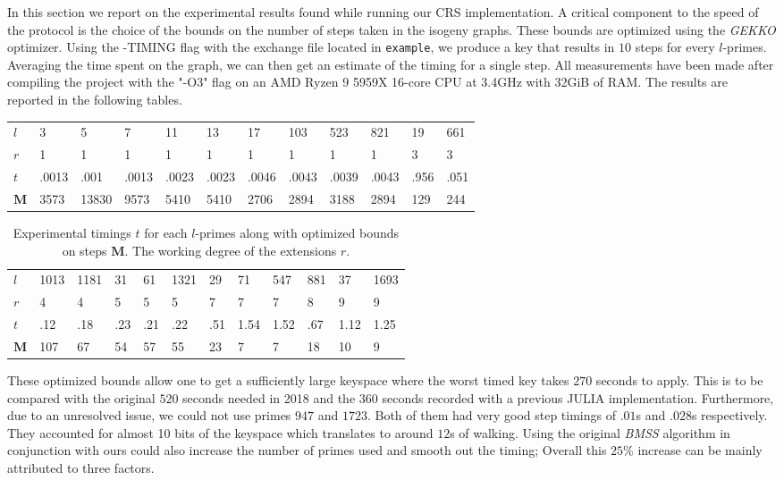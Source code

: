 \documentclass[../main.tex]{subfiles}
\begin{document}
In this section we report on the experimental results found while running our CRS implementation.
A critical component to the speed of the protocol is the choice of the bounds on the number of steps taken in the isogeny graphs.
These bounds are optimized using the \textit{GEKKO} optimizer.
Using the -TIMING flag with the exchange file located in \texttt{example}, we produce a key that results in $10$ steps for every $l$-primes.
Averaging the time spent on the graph, we can then get an estimate of the timing for a single step.
All measurements have been made after compiling the project with the "-O3" flag on an AMD Ryzen 9 5959X 16-core CPU at 3.4GHz with 32GiB of RAM.
The results are reported in the following tables.

\begin{table}[h]
\begin{tabular}{llllllllllll}
\cline{1-1}
\multicolumn{1}{|l|}{$l$} & 3     & 5     & 7     & 11    & 13    & 17    & 103   & 523   & 821   & 19   & 661  \\ \cline{1-1}
$r$                       & 1     & 1     & 1     & 1     & 1     & 1     & 1     & 1     & 1     & 3    & 3    \\
$t$                       & .0013 & .001  & .0013 & .0023 & .0023 & .0046 & .0043 & .0039 & .0043 & .956 & .051 \\
$\mathbf{M}$              & 3573  & 13830 & 9573  & 5410  & 5410  & 2706  & 2894  & 3188  & 2894  & 129  & 244
\end{tabular}
\end{table}
\begin{table}[h]
\begin{tabular}{llllllllllll}
\cline{1-1}
\multicolumn{1}{|l|}{$l$} & 1013 & 1181 & 31  & 61  & 1321 & 29  & 71   & 547  & 881 & 37   & 1693 \\ \cline{1-1}
$r$                       & 4    & 4    & 5   & 5   & 5    & 7   & 7    & 7    & 8   & 9    & 9    \\
$t$                       & .12  & .18  & .23 & .21 & .22  & .51 & 1.54 & 1.52 & .67 & 1.12 & 1.25 \\
$\mathbf{M}$              & 107  & 67   & 54  & 57  & 55   & 23  & 7    & 7    & 18  & 10   & 9
\end{tabular}
	\caption{Experimental timings $t$ for each $l$-primes along with optimized bounds on steps $\mathbf{M}$. The working degree of the extensions $r$.}
\end{table}
These optimized bounds allow one to get a sufficiently large keyspace where the worst timed key takes $270$ seconds to apply.
This is to be compared with the original $520$ seconds needed in 2018 and the $360$ seconds recorded with a previous JULIA implementation.
Furthermore, due to an unresolved issue, we could not use primes $947$ and $1723$.
Both of them had very good step timings of $.01$s and $.028$s respectively.
They accounted for almost 10 bits of the keyspace which translates to around $12$s of walking.
Using the original \textit{BMSS} algorithm in conjunction with ours could also increase the number of primes used and smooth out the timing;
Overall this $25$\% increase can be mainly attributed to three factors.
\end{document}
